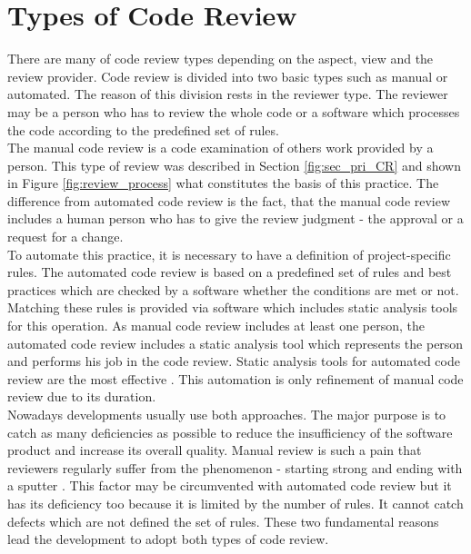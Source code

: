 \section{Types of Code Review}

There are many of code review types depending on the aspect, view and the review provider. Code review is divided into two basic types such as manual or automated. The reason of this division rests in the reviewer type. The reviewer may be a person who has to review the whole code or a software which processes the code according to the predefined set of rules.\\

The manual code review is a code examination of others work provided by a person. This type of review was described in Section \ref{fig:sec_pri_CR} and shown in Figure \ref{fig:review_process} what constitutes the basis of this practice. The difference from automated code review is the fact, that the manual code review includes a human person who has to give the review judgment - the approval or a request for a change.\\

To automate this practice, it is necessary to have a definition of project-specific rules. The automated code review is based on a predefined set of rules and best practices which are checked by a software whether the conditions are met or not. Matching these rules is provided via software which includes static analysis tools for this operation. As manual code review includes at least one person, the automated code review includes a static analysis tool which represents the person and performs his job in the code review. Static analysis tools for automated code review are the most effective \cite{CodeReview_security}. This automation is only refinement of manual code review due to its duration.\\

Nowadays developments usually use both approaches. The major purpose is to catch as many deficiencies as possible to reduce the insufficiency of the software product and increase its overall quality. Manual review is such a pain that reviewers regularly suffer from the  phenomenon - starting strong and ending with a sputter \cite{CodeReview_security}. This factor may be circumvented with automated code review but it has its deficiency too because it is limited by the number of rules. It cannot catch defects which are not defined the set of rules. These two fundamental reasons lead the development to adopt both types of code review.

